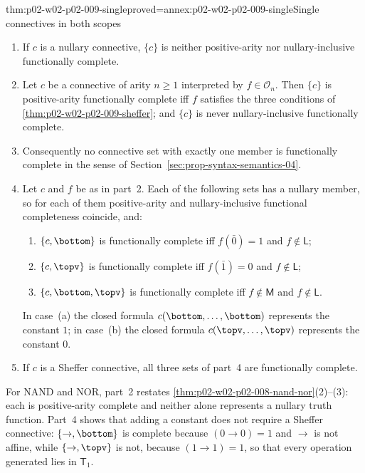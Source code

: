 \begin{hbtheorem}{thm:p02-w02-p02-009-single}{proved=annex:p02-w02-p02-009-single}{Single connectives in both scopes}
\begin{enumerate}
\item If \(c\) is a nullary connective, \(\{c\}\) is neither positive-arity
  nor nullary-inclusive functionally complete.
\item Let \(c\) be a connective of arity \(n\geq1\) interpreted by
  \(f\in\mathcal O_n\).  Then \(\{c\}\) is positive-arity functionally
  complete iff \(f\) satisfies the three conditions of
  \cref{thm:p02-w02-p02-009-sheffer}; and \(\{c\}\) is never
  nullary-inclusive functionally complete.
\item Consequently no connective set with exactly one member is
  functionally complete in the sense of
  Section~\ref{sec:prop-syntax-semantics-04}.
\item Let \(c\) and \(f\) be as in part~2.  Each of the following sets has a
  nullary member, so for each of them positive-arity and nullary-inclusive
  functional completeness coincide, and:
  \begin{enumerate}
  \item \(\{c,\bottom\}\) is functionally complete iff \(f(\bar0)=1\) and
    \(f\notin\mathsf L\);
  \item \(\{c,\topv\}\) is functionally complete iff \(f(\bar1)=0\) and
    \(f\notin\mathsf L\);
  \item \(\{c,\bottom,\topv\}\) is functionally complete iff
    \(f\notin\mathsf M\) and \(f\notin\mathsf L\).
  \end{enumerate}
  In case~(a) the closed formula \(c(\bottom,\ldots,\bottom)\) represents
  the constant \(1\); in case~(b) the closed formula
  \(c(\topv,\ldots,\topv)\) represents the constant \(0\).
\item If \(c\) is a Sheffer connective, all three sets of part~4 are
  functionally complete.
\end{enumerate}
\end{hbtheorem}

For \(\mathrm{NAND}\) and \(\mathrm{NOR}\), part~2 restates
\cref{thm:p02-w02-p02-008-nand-nor}(2)--(3): each is positive-arity complete
and neither alone represents a nullary truth function.  Part~4 shows that
adding a constant does not require a Sheffer connective: \(\{\to,\bottom\}\)
is complete because \((0\to0)=1\) and \(\to\) is not affine, while
\(\{\to,\topv\}\) is not, because \((1\to1)=1\), so that every operation
generated lies in \(\mathsf T_1\).


